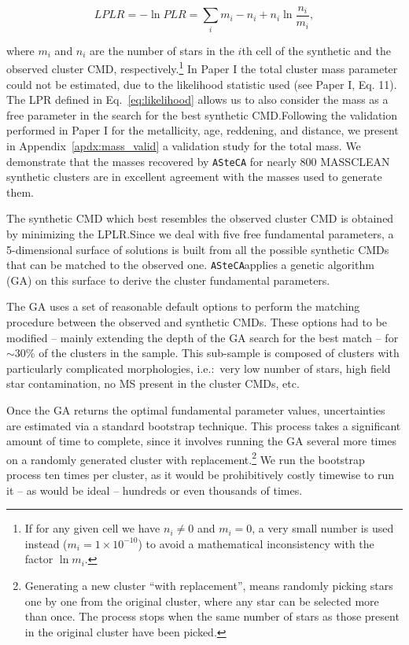 \documentclass{aa}
\begin{document}
\begin{equation}
LPLR  = -\ln PLR = \sum_i m_i - n_i + n_i \ln \frac{n_i}{m_i},
\label{eq:likelihood}
\end{equation}

\noindent where $m_i$ and $n_i$ are the number of stars in the $i$th cell of
the synthetic and the observed cluster CMD, respectively.\footnote{If for any
given cell we have $n_i\neq0$ and $m_i=0$, a very small number is used instead 
($m_i=1{\times}10^{-10}$) to avoid a mathematical inconsistency with the factor
$\ln m_i$.}
%
In Paper I the total cluster mass parameter could not be estimated, due to the
likelihood statistic used (see Paper I, Eq. 11). The LPR defined in
Eq.~\ref{eq:likelihood} allows us to also consider the mass as a free parameter
in the search for the best synthetic CMD.\@ Following the validation performed
in Paper I for the metallicity, age, reddening, and distance, we present in
Appendix~\ref{apdx:mass_valid} a validation study for the total mass. We
demonstrate that the masses recovered by \texttt{ASteCA} for nearly 800
MASSCLEAN synthetic clusters are in excellent agreement with the masses
used to generate them.

The synthetic CMD which best resembles the observed cluster CMD is obtained by
minimizing the LPLR.\@ Since we deal with five free fundamental parameters, a
5-dimensional surface of solutions is built from all the possible synthetic CMDs
that can be matched to the observed one.
%
\texttt{ASteCA}applies a genetic algorithm (GA) on this surface to derive the
cluster fundamental parameters.

The GA uses a set of reasonable default options to perform the matching
procedure between the observed and synthetic CMDs. These options had to be
modified -- mainly extending the depth of the GA search for the best match --
for $\sim$30\% of the clusters in the sample. This sub-sample is composed of
clusters with particularly complicated morphologies, i.e.:\ very low number of
stars, high field star contamination, no MS present in the cluster CMDs, etc.

Once the GA returns the optimal fundamental parameter values,
uncertainties are estimated via a standard bootstrap technique. This process
takes a significant amount of time to complete, since it involves running the GA
several more times on a randomly generated cluster with
replacement.\footnote{Generating a new cluster ``with replacement'', means randomly
picking stars one by one from the original cluster, where any star can be selected
more than once. The process stops when the same number of stars as those present
in the original cluster have been picked.}
We run the bootstrap process ten times per cluster, as it would be prohibitively
costly timewise to run it -- as would be ideal -- hundreds or even thousands of
times.
\end{document}
